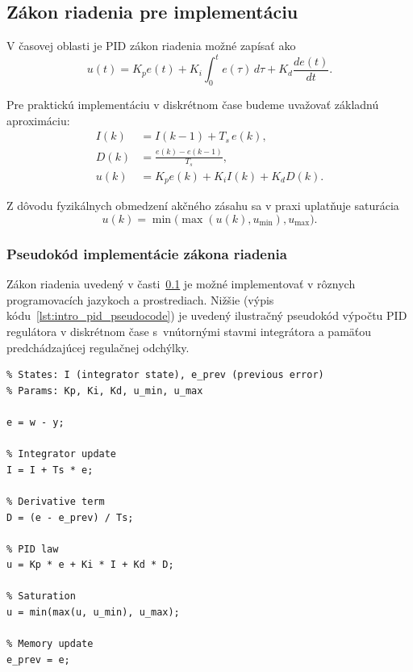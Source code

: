 \subsection{Zákon riadenia pre implementáciu}
\label{sec:intro_control_law}

V časovej oblasti je PID zákon riadenia možné zapísať ako
\begin{equation}
    u(t) = K_p e(t) + K_i \int_0^t e(\tau)\,d\tau + K_d \frac{d e(t)}{dt}.
    \label{eq:intro_pid_law_cont}
\end{equation}

Pre praktickú implementáciu v diskrétnom čase budeme uvažovať základnú aproximáciu:
\begin{align}
    I(k) &= I(k-1) + T_s\,e(k), \label{eq:intro_int_update} \\
    D(k) &= \frac{e(k) - e(k-1)}{T_s}, \label{eq:intro_der_update} \\
    u(k) &= K_p e(k) + K_i I(k) + K_d D(k).
    \label{eq:intro_pid_law_disc}
\end{align}

Z dôvodu fyzikálnych obmedzení akčného zásahu sa v praxi uplatňuje saturácia
\begin{equation}
    u(k) = \min\bigl(\max(u(k),u_{\min}),u_{\max}\bigr).
    \label{eq:intro_saturation}
\end{equation}


\subsubsection{Pseudokód implementácie zákona riadenia}

Zákon riadenia uvedený v časti~\ref{sec:intro_control_law} je možné implementovať v rôznych programovacích jazykoch a prostrediach. Nižšie (výpis kódu~\ref{lst:intro_pid_pseudocode}) je uvedený ilustračný pseudokód výpočtu PID regulátora v diskrétnom čase s~vnútornými stavmi integrátora a pamäťou predchádzajúcej regulačnej odchýlky.

\begin{lstlisting}[style=pseudocode,
caption={Pseudokód diskrétnej implementácie PID regulátora (ilustračný príklad)},
label={lst:intro_pid_pseudocode}]
% Inputs: w (setpoint), y (output), Ts
% States: I (integrator state), e_prev (previous error)
% Params: Kp, Ki, Kd, u_min, u_max

e = w - y;

% Integrator update
I = I + Ts * e;

% Derivative term
D = (e - e_prev) / Ts;

% PID law
u = Kp * e + Ki * I + Kd * D;

% Saturation
u = min(max(u, u_min), u_max);

% Memory update
e_prev = e;
\end{lstlisting}

\clearpage
